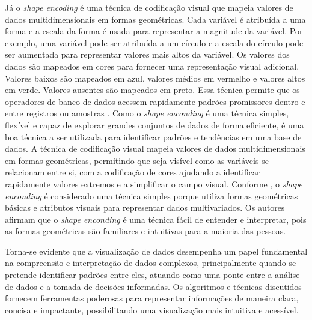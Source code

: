 Já o \textit{shape encoding} é uma técnica de codificação visual que mapeia valores de dados multidimensionais em formas geométricas. Cada variável é atribuída a uma forma e a escala da forma é usada para representar a magnitude da variável. Por exemplo, uma variável pode ser atribuída a um círculo e a escala do círculo pode ser aumentada para representar valores mais altos da variável. Os valores dos dados são mapeados em cores para fornecer uma representação visual adicional. Valores baixos são mapeados em azul, valores médios em vermelho e valores altos em verde. Valores ausentes são mapeados em preto. Essa técnica permite que os operadores de banco de dados acessem rapidamente padrões promissores dentro e entre registros ou amostras \cite{beddow:1990}. Como o \textit{shape enconding} é uma técnica simples, flexível e capaz de explorar grandes conjuntos de dados de forma eficiente, é uma boa técnica a ser utilizada para identificar padrões e tendências em uma base de dados. A técnica de codificação visual mapeia valores de dados multidimensionais em formas geométricas, permitindo que seja visível como as variáveis se relacionam entre si, com a codificação de cores ajudando a identificar rapidamente valores extremos e a simplificar o campo visual. Conforme , o \textit{shape enconding} é considerado uma técnica simples porque utiliza formas geométricas básicas e atributos visuais para representar dados multivariados. Os autores afirmam que o \textit{shape enconding} é uma técnica fácil de entender e interpretar, pois as formas geométricas são familiares e intuitivas para a maioria das pessoas.%

{Torna-se evidente que a visualização de dados desempenha um papel fundamental na compreensão e interpretação de dados complexos, principalmente quando se pretende identificar padrões entre eles, atuando como uma ponte entre a análise de dados e a tomada de decisões informadas. Os algoritmos e técnicas discutidos fornecem ferramentas poderosas para representar informações de maneira clara, concisa e impactante, possibilitando uma visualização mais intuitiva e acessível.}


